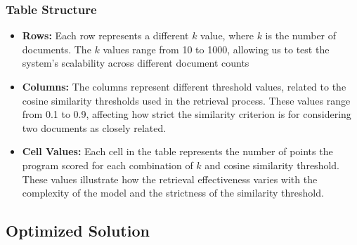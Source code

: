 \documentclass[12pt,a4paper]{article}
\begin{document}
\subsubsection{Table Structure}
\begin{itemize}
  \item \textbf{Rows:} Each row represents a different \( k \) value, where \( k \) is the number of documents. The \( k \) values range from 10 to 1000, allowing us to test the system's scalability across different document counts
  \item \textbf{Columns:} The columns represent different threshold values, related to the cosine similarity thresholds used in the retrieval process. These values range from 0.1 to 0.9, affecting how strict the similarity criterion is for considering two documents as closely related.
  \item \textbf{Cell Values:} Each cell in the table represents the number of points the program scored for each combination of \( k \) and cosine similarity threshold. These values illustrate how the retrieval effectiveness varies with the complexity of the model and the strictness of the similarity threshold.

\end{itemize}


\subsection{Optimized Solution}
\end{document}
